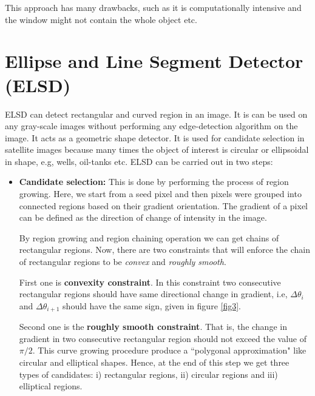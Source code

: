 \par This approach has many drawbacks, such as it is computationally intensive and the window might not contain the whole object etc. 


\section{Ellipse and Line Segment Detector (ELSD)}
ELSD \cite{b4} can detect rectangular and curved region in an image. It is can be used on any gray-scale images without performing any edge-detection algorithm on the image. It acts as a geometric shape detector. It is used for candidate selection in satellite images because many times the object of interest is circular or ellipsoidal in shape, e.g, wells, oil-tanks etc. ELSD can be carried out in two steps: 
\begin{itemize}
    \item \textbf{Candidate selection: }This is done by performing the process of region growing. Here, we start from a seed pixel and then pixels were grouped into connected regions based on their gradient orientation. The gradient of a pixel can be defined as the direction of change of intensity in the image. 
    \par By region growing and region chaining operation we can get chains of rectangular regions. Now, there are two constraints that will enforce the chain of rectangular regions to be \textit{convex} and \textit{roughly smooth}.
    \par First one is \textbf{convexity constraint}. In this constraint two consecutive rectangular regions should have same directional change in gradient, i.e, $\Delta \theta_i$ and $\Delta \theta_{i+1}$ should have the same sign, given in figure \ref{fig3}.
    \par Second one is the \textbf{roughly smooth constraint}. That is, the change in gradient in two consecutive rectangular region should not exceed the value of $\pi / 2$. This curve growing procedure produce a ``polygonal approximation" \cite{b4} like circular and elliptical shapes. Hence, at the end of this step we get three types of candidates: i) rectangular regions, ii) circular regions and iii) elliptical regions. 
    

\end{itemize}
